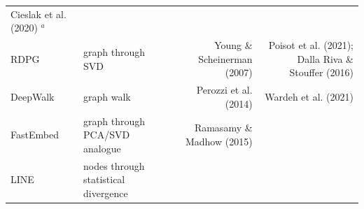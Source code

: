 \documentclass[11pt]{article}
\begin{document}
\begin{longtable}[]{@{}llrr@{}}
\begin{minipage}[t]{0.32\columnwidth}
Cieslak et al. (2020) \(^a\)\strut
\end{minipage}\tabularnewline
\begin{minipage}[t]{0.11\columnwidth}\raggedright
RDPG\strut
\end{minipage} & \begin{minipage}[t]{0.30\columnwidth}\raggedright
graph through SVD\strut
\end{minipage} & \begin{minipage}[t]{0.16\columnwidth}\raggedleft
Young \& Scheinerman (2007)\strut
\end{minipage} & \begin{minipage}[t]{0.32\columnwidth}\raggedleft
Poisot et al. (2021); Dalla Riva \& Stouffer (2016)\strut
\end{minipage}\tabularnewline
\begin{minipage}[t]{0.11\columnwidth}\raggedright
DeepWalk\strut
\end{minipage} & \begin{minipage}[t]{0.30\columnwidth}\raggedright
graph walk\strut
\end{minipage} & \begin{minipage}[t]{0.16\columnwidth}\raggedleft
Perozzi et al. (2014)\strut
\end{minipage} & \begin{minipage}[t]{0.32\columnwidth}\raggedleft
Wardeh et al. (2021)\strut
\end{minipage}\tabularnewline
\begin{minipage}[t]{0.11\columnwidth}\raggedright
FastEmbed\strut
\end{minipage} & \begin{minipage}[t]{0.30\columnwidth}\raggedright
graph through PCA/SVD analogue\strut
\end{minipage} & \begin{minipage}[t]{0.16\columnwidth}\raggedleft
Ramasamy \& Madhow (2015)\strut
\end{minipage} & \begin{minipage}[t]{0.32\columnwidth}\raggedleft
\strut
\end{minipage}\tabularnewline
\begin{minipage}[t]{0.11\columnwidth}\raggedright
LINE\strut
\end{minipage} & \begin{minipage}[t]{0.30\columnwidth}\raggedright
nodes through statistical divergence\strut
\end{minipage} & \begin{minipage}[t]{0.16\columnwidth}\raggedleft

\end{minipage}
\end{longtable}
\end{document}
